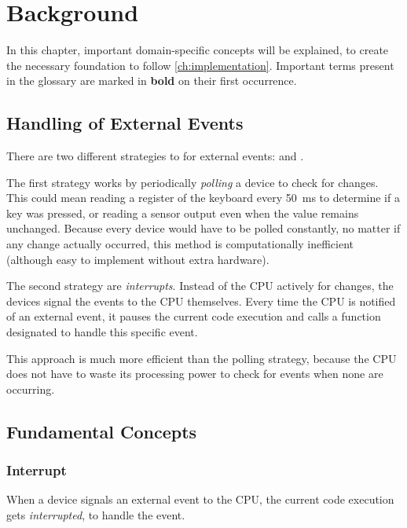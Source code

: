 \chapter{Background}
\label{ch:background}

In this chapter, important domain-specific concepts will be explained, to create the necessary foundation to follow \autoref{ch:implementation}.
Important terms present in the glossary are marked in \textbf{bold} on their first occurrence.

\clearpage

\section{Handling of External Events}
\label{sec:eventhandling}

There are two different strategies to  for external events:  and .

The first strategy works by periodically \textit{polling} a device to check for changes.
This could mean reading a register of the keyboard every \SI{50}{\milli\second} to determine if a key was pressed, or reading a sensor output even when the value remains unchanged.
Because every device would have to be polled constantly, no matter if any change actually occurred, this method is computationally inefficient (although easy to implement without extra hardware).

The second strategy are \textit{interrupts}.
Instead of the CPU actively  for changes, the devices signal the events to the CPU themselves.
Every time the CPU is notified of an external event, it pauses the current code execution and calls a function designated to handle this specific event.

This approach is much more efficient than the polling strategy, because the CPU does not have to waste its processing power to check for events when none are occurring.

\section{Fundamental Concepts}
\label{sec:fundamentals}

\subsection{Interrupt}
\label{subsec:interrupt}

When a device signals an external event to the CPU, the current code execution gets \textit{interrupted}, to handle the event.

